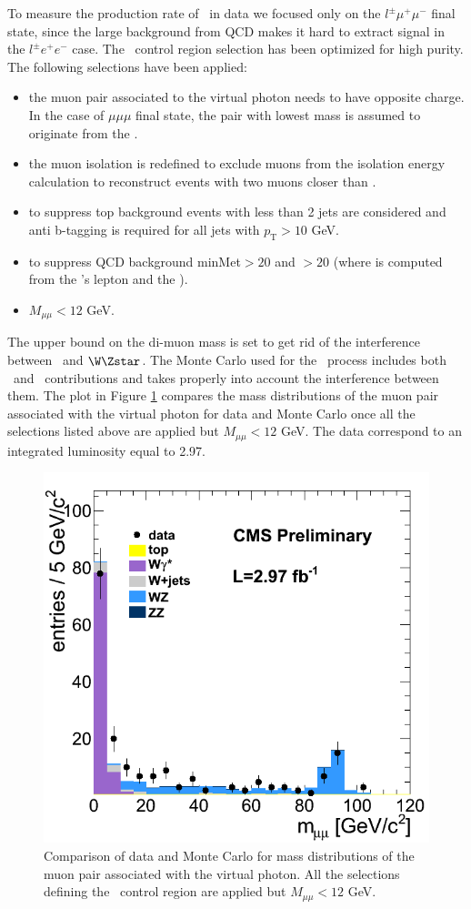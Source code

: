 To measure the production rate of \Wgstar\ in data we focused only on
the \ensuremath{l^{\pm}\mu^{+}\mu^{-}} final state, since the large
background from QCD makes it hard to extract signal in
the \ensuremath{l^{\pm}e^{+}e^{-}} case.  The \Wgstar\ control region
selection has been optimized for high purity.  The following
selections have been applied:
\begin{itemize}
\item 
the muon pair associated to the virtual photon needs to have opposite
charge. In the case of \ensuremath{\mu\mu\mu} final state, the pair
with lowest mass is assumed to originate from the \Astar.
\item 
the muon isolation is redefined to exclude muons from the isolation
energy calculation to reconstruct events with two muons closer
than .
\item 
to suppress top background events with less than 2 jets are
considered and anti b-tagging is required for all jets
with \ensuremath{p_\mathrm{T}>10} GeV.
\item 
to suppress QCD background minMet$>20$ and \mt$>20$ (where \mt is
computed from the \W's lepton and the \met).
\item 
\ensuremath{M_{\mu\mu}<12} GeV.
\end{itemize} 

The upper bound on the di-muon mass is set to get rid of the
interference between \Wgstar\ and \ensuremath{\W\Zstar}.  The Monte
Carlo used for the \WZ\ process includes both \Astar\ and \Zstar\
contributions and takes properly into account the interference between
them.  The plot in Figure \ref{fig:WgammaStarMass} compares the mass
distributions of the muon pair associated with the virtual photon for
data and Monte Carlo once all the selections listed above are applied
but \ensuremath{M_{\mu\mu}<12} GeV.  The data correspond to an
integrated luminosity equal to 2.97\ifb.

\begin{figure}[hbt]
\begin{center}
\includegraphics[width=0.5\linewidth]{figures/gammaMass_m120.png} 
\caption{\label{fig:WgammaStarMass}\protect Comparison of data and Monte Carlo for  
mass distributions of the muon pair associated with the virtual
photon.  All the selections defining the \Wgstar\ control region are
applied but \ensuremath{M_{\mu\mu}<12} GeV.}
\end{center}
\end{figure}

